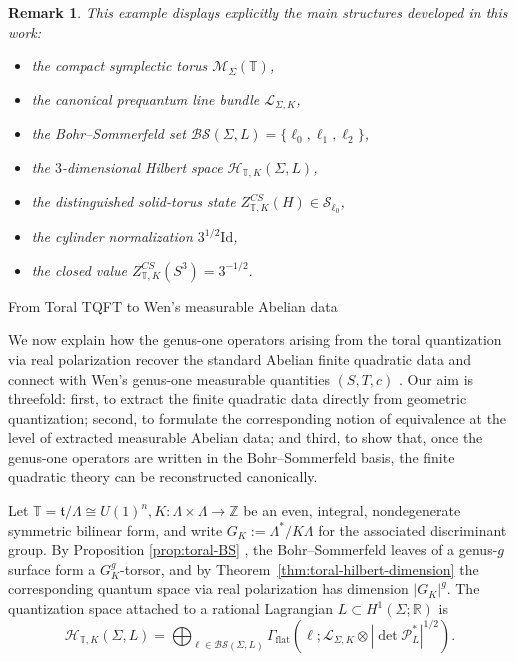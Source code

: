 \documentclass[12pt]{amsart}
\makeatletter
\renewcommand\subsection{\@startsection{subsection}{2}%
  \z@{.5\linespacing\@plus.7\linespacing}{-.5em}%
  {\normalfont\bfseries}}
\numberwithin{equation}{section}
\newtheorem*{remark}{Remark}
\makeatother
\begin{document}
\begin{remark}
This example displays explicitly the main structures developed in this work:
\begin{itemize}
\item the compact symplectic torus \(\mathcal M_\Sigma(\mathbb T)\),
\item the canonical prequantum line bundle \(\mathcal L_{\Sigma,K}\),
\item the Bohr--Sommerfeld set \(\mathcal{BS}(\Sigma,L)=\{\ell_0,\ell_1,\ell_2\}\),
\item the \(3\)-dimensional Hilbert space \(\mathcal H_{\mathbb T,K}(\Sigma,L)\),
\item the distinguished solid-torus state \(Z^{CS}_{\mathbb T,K}(H)\in \mathcal S_{\ell_0}\),
\item the cylinder normalization \(3^{1/2}\mathrm{Id}\),
\item the closed value \(Z^{CS}_{\mathbb T,K}(S^3)=3^{-1/2}\).
\end{itemize}
\end{remark}

\subsection{From Toral TQFT to Wen's measurable Abelian data}

We now explain how the genus-one operators arising from the toral
quantization via real polarization recover the standard Abelian finite quadratic data and connect with Wen's
genus-one measurable quantities \((S,T,c)\) \cite{Wen2016}. Our aim is threefold:
first, to extract the finite quadratic data directly from geometric quantization;
second, to formulate the corresponding notion of equivalence at the level of extracted
measurable Abelian data; and third, to show that, once the genus-one operators are written
in the Bohr--Sommerfeld basis, the finite quadratic theory can be reconstructed canonically.

Let $\mathbb T=\mathfrak t/\Lambda \cong U(1)^n, K:\Lambda\times \Lambda \to \mathbb Z$
be an even, integral, nondegenerate symmetric bilinear form, and write $G_K:=\Lambda^*/K\Lambda$ for the associated discriminant group. By Proposition \ref{prop:toral-BS} , the Bohr--Sommerfeld leaves
of a genus-\(g\) surface form a \(G_K^g\)-torsor, and by Theorem~\ref{thm:toral-hilbert-dimension} the corresponding quantum space via real polarization has dimension \(|G_K|^g\). The quantization space attached
to a rational Lagrangian \(L\subset H^1(\Sigma;\mathbb R)\) is
\[
\mathcal{H}_{\mathbb T,K}(\Sigma,L)
=
\bigoplus_{\ell\in \mathcal{BS}(\Sigma,L)}
\Gamma_{\mathrm{flat}}\!\left(
\ell;\mathcal{L}_{\Sigma,K}\otimes |\det \mathcal{P}_L^*|^{1/2}
\right).
\]
\end{document}
